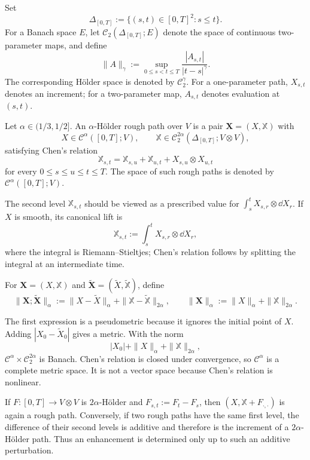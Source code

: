 Set
\[
  \Delta_{[0,T]}:=\{(s,t)\in[0,T]^2:s\le t\}.
\]
For a Banach space $E$, let $\mathcal C_2(\Delta_{[0,T]};E)$ denote the space of
continuous two-parameter maps, and define
\[
  \|A\|_\gamma:=\sup_{0\le s<t\le T}
  \frac{|A_{s,t}|}{|t-s|^\gamma}.
\]
The corresponding Hölder space is denoted by $\mathcal C_2^\gamma$.
For a one-parameter path, $X_{s,t}$ denotes an increment; for a two-parameter
map, $A_{s,t}$ denotes evaluation at $(s,t)$.

\begin{de}
Let $\alpha\in(1/3,1/2]$.  An $\alpha$-Hölder rough path over $V$ is a pair
$\mathbf X=(X,\mathbb X)$ with
\[
  X\in\mathcal C^\alpha([0,T];V),\qquad
  \mathbb X\in\mathcal C_2^{2\alpha}(\Delta_{[0,T]};V\otimes V),
\]
satisfying Chen's relation
\[
  \mathbb X_{s,t}
  =\mathbb X_{s,u}+\mathbb X_{u,t}+X_{s,u}\otimes X_{u,t}
\]
for every $0\le s\le u\le t\le T$.  The space of such rough paths is denoted
by $\mathscr C^\alpha([0,T];V)$.
\end{de}

The second level $\mathbb X_{s,t}$ should be viewed as a prescribed value for
$\int_s^t X_{s,r}\otimes\dd X_r$.  If $X$ is smooth, its canonical lift is
\[
  \mathbb X_{s,t}:=\int_s^t X_{s,r}\otimes\dd X_r,
\]
where the integral is Riemann--Stieltjes; Chen's relation follows by splitting
the integral at an intermediate time.

\begin{de}
For $\mathbf X=(X,\mathbb X)$ and
$\widetilde{\mathbf X}=(\widetilde X,\widetilde{\mathbb X})$, define
\[
  \|\mathbf X;\widetilde{\mathbf X}\|_\alpha
  :=\|X-\widetilde X\|_\alpha
    +\|\mathbb X-\widetilde{\mathbb X}\|_{2\alpha},
  \qquad
  \|\mathbf X\|_\alpha:=\|X\|_\alpha+\|\mathbb X\|_{2\alpha}.
\]
\end{de}

The first expression is a pseudometric because it ignores the initial point of
$X$.  Adding $|X_0-\widetilde X_0|$ gives a metric.  With the norm
\[
  |X_0|+\|X\|_\alpha+\|\mathbb X\|_{2\alpha},
\]
$\mathcal C^\alpha\times\mathcal C_2^{2\alpha}$ is Banach.  Chen's relation is
closed under convergence, so $\mathscr C^\alpha$ is a complete metric space.
It is not a vector space because Chen's relation is nonlinear.

If $F\colon[0,T]\to V\otimes V$ is $2\alpha$-Hölder and
$F_{s,t}:=F_t-F_s$, then $(X,\mathbb X+F_{\cdot,\cdot})$ is again a rough path.
Conversely, if two rough paths have the same first level, the difference of
their second levels is additive and therefore is the increment of a
$2\alpha$-Hölder path.  Thus an enhancement is determined only up to such an
additive perturbation.

